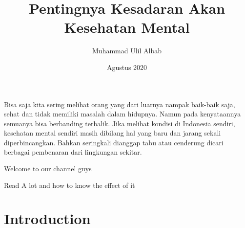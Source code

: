 \documentclass{article}
\title{Pentingnya Kesadaran Akan Kesehatan Mental}
\author{Muhammad Ulil Albab }
\date{Agustus 2020}
\begin{document}
Bisa saja kita sering melihat orang yang dari luarnya nampak baik-baik saja, sehat dan tidak memiliki masalah dalam hidupnya. Namun pada kenyataannya semuanya bisa berbanding terbalik. Jika melihat kondisi di Indonesia sendiri, kesehatan mental sendiri masih dibilang hal yang baru dan jarang sekali diperbincangkan. Bahkan seringkali dianggap tabu atau cenderung dicari berbagai pembenaran dari lingkungan sekitar.  \par


Welcome to our channel guys\par
Read A lot and how to know the effect of it


\maketitle

\section{Introduction}
\end{document}
